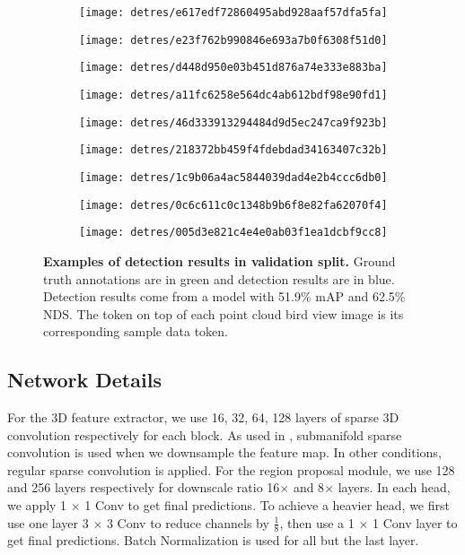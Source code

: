 \documentclass[10pt,twocolumn,letterpaper]{article}
\begin{document}
\begin{figure*}[t]
\centering
\begin{subfigure}[b]{.33\linewidth}
\texttt{[image: detres/e617edf72860495abd928aaf57dfa5fa]}
\end{subfigure}
\begin{subfigure}[b]{.33\linewidth}
\texttt{[image: detres/e23f762b990846e693a7b0f6308f51d0]}
\end{subfigure}
\begin{subfigure}[b]{.33\linewidth}
\texttt{[image: detres/d448d950e03b451d876a74e333e883ba]}
\end{subfigure}
\begin{subfigure}[b]{.33\linewidth}
\texttt{[image: detres/a11fc6258e564dc4ab612bdf98e90fd1]}
\end{subfigure}
\begin{subfigure}[b]{.33\linewidth}
\texttt{[image: detres/46d333913294484d9d5ec247ca9f923b]}
\end{subfigure}
\begin{subfigure}[b]{.33\linewidth}
\texttt{[image: detres/218372bb459f4fdebdad34163407c32b]}
\end{subfigure}
\begin{subfigure}[b]{.33\linewidth}
\texttt{[image: detres/1c9b06a4ac5844039dad4e2b4ccc6db0]}
\end{subfigure}
\begin{subfigure}[b]{.33\linewidth}
\texttt{[image: detres/0c6c611c0c1348b9b6f8e82fa62070f4]}
\end{subfigure}
\begin{subfigure}[b]{.33\linewidth}
\texttt{[image: detres/005d3e821c4e4e0ab03f1ea1dcbf9cc8]}
\end{subfigure}
\caption{\textbf{Examples of detection results in validation split.} Ground truth annotations are in green and detection results are in blue. Detection results come from a model with 51.9\% mAP and 62.5\% NDS. The token on top of each point cloud bird view image is its corresponding sample data token.}
\label{fig:examplesbev}
\end{figure*}


\subsection{Network Details}

For the 3D feature extractor, we use 16, 32, 64, 128 layers of sparse 3D convolution respectively for each block. As used in \cite{DBLP:journals/corr/GrahamM17}, submanifold sparse convolution is used when we downsample the feature map. In other conditions, regular sparse convolution is applied. For the region proposal module, we use 128 and 256 layers respectively for downscale ratio 16$\times$ and 8$\times$ layers. In each head, we apply 1 $\times$ 1 Conv to get final predictions. To achieve a heavier head, we first use one layer 3 $\times$ 3 Conv to reduce channels by $\frac{1}{8}$, then use a 1 $\times$ 1 Conv layer to get final predictions. Batch Normalization \cite{DBLP:journals/corr/IoffeS15} is used for all but the last layer.
\end{document}
